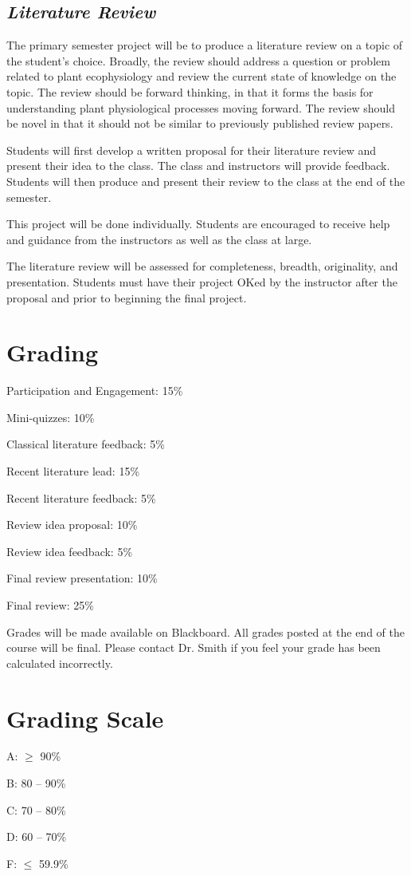 \documentclass[12pt, notitlepage]{article}   	%
\begin{document}
{\subsection{\textit{Literature Review}}
The primary semester project will be to produce a literature review on a topic 
of the student's choice.
Broadly, the review should address a question or problem related 
to plant ecophysiology and review the current state of knowledge on the topic.
The review should be forward thinking, in that it forms the
basis for understanding plant physiological processes moving forward.
The review should be novel in that it should not be similar to previously published
review papers.

Students will first develop a written proposal for their literature review and present 
their idea to the class. The class and instructors will provide feedback. Students will then produce and present 
their review to the class at the end of the semester. 

This project will be done individually. Students are encouraged to receive help and guidance 
from the instructors as well as the class at large. 

The literature review will be assessed for completeness, breadth, originality, and presentation.
Students must have their project OKed by the instructor after the proposal and prior to
beginning the final project.

\section{Grading}
Participation and Engagement: 15\% \par
Mini-quizzes: 10\% \par
Classical literature feedback: 5\% \par
Recent literature lead: 15\% \par
Recent literature feedback: 5\% \par
Review idea proposal: 10\% \par
Review idea feedback: 5\% \par
Final review presentation: 10\% \par
Final review: 25\% \par

Grades will be made available on Blackboard. 
All grades posted at the end of the course will be final.
Please contact Dr. Smith if you feel your grade has been calculated incorrectly.

\section{Grading Scale}
A: $\geq$ 90\% \par
B: 80 – 90\% \par
C: 70 – 80\% \par
D: 60 – 70\% \par
F: $\leq$ 59.9\% \par

}
\end{document}

